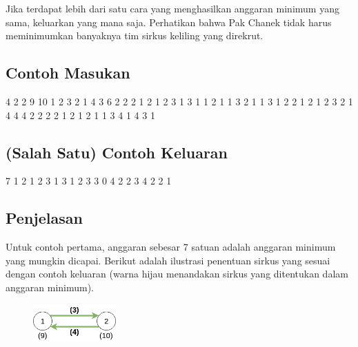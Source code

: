 \documentclass[../main_problemset.tex]{subfiles} %
\begin{document}
Jika terdapat lebih dari satu cara yang menghasilkan anggaran minimum yang sama, keluarkan yang mana saja. Perhatikan bahwa Pak Chanek tidak harus meminimumkan banyaknya tim sirkus keliling yang direkrut.

\vspace{.4cm}

\begin{minipage}[t]{0.5\textwidth}
\subsection*{Contoh Masukan}

\begin{lcverbatim}
4
2 2
9 10
1 2 3
2 1 4
3 6
2 2 2
1 2 1
2 3 1
3 1 1
2 1 1
3 2 1
1 3 1
2 2
1 2
1 2 3
2 1 4
4 4
2 2 2 2
1 2 1
2 1 1
3 4 1
4 3 1
\end{lcverbatim}
\end{minipage}
\begin{minipage}[t]{0.5\textwidth}
\subsection*{(Salah Satu) Contoh Keluaran}

\begin{lcverbatim}
7 1
2 1 2
3 1
3 1 2 3
3 0
4 2
2 3 4
2 2 1
\end{lcverbatim}
\end{minipage}

\subsection*{Penjelasan}

Untuk contoh pertama, anggaran sebesar 7 satuan adalah anggaran minimum yang mungkin dicapai. Berikut adalah ilustrasi penentuan sirkus yang sesuai dengan contoh keluaran (warna hijau menandakan sirkus yang ditentukan dalam anggaran minimum).

\begin{figure}[H]
	\centering
	\includegraphics[width=120px]{bis-ddak/asset/Sample_1_OK}
\end{figure}
\end{document}
